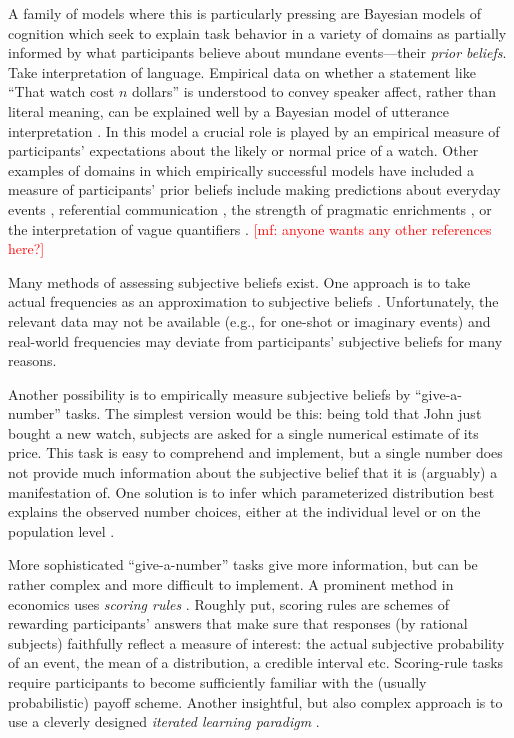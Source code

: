 \documentclass[10pt,letterpaper]{article}
\newcommand{\mf}[1]{\textcolor{Red}{[mf: #1]}}
\newcommand{\citep}[1]{\cite{#1}}
\begin{document}
A family of models where this is particularly pressing are Bayesian models of cognition which
seek to explain task behavior in a variety of domains as partially informed by what
participants believe about mundane events---their \emph{prior beliefs}. Take interpretation of
language. Empirical data on whether a statement like ``That watch cost $n$ dollars'' is
understood to convey speaker affect, rather than literal meaning, can be explained well by a
Bayesian model of utterance interpretation \citep{KaoWu2014:Nonliteral-Unde}. In this model a
crucial role is played by an empirical measure of participants' expectations about the likely
or normal price of a watch.  Other examples of domains in which empirically successful models
have included a measure of participants' prior beliefs include making predictions about
everyday events \citep{GriffithsTenenbaum2006:Optimal-Predict}, referential communication
\citep{FrankGoodman2012:Predicting-Prag}, the strength of pragmatic enrichments
\citep{DegenTessler2015:Wonky-worlds:-L}, or the interpretation of vague quantifiers
\citep{SchollerFranke2015:Semantic-values}. \mf{anyone wants any other references here?}

Many methods of assessing subjective beliefs exist. One approach is to take actual frequencies
as an approximation to subjective beliefs
\citep{GriffithsTenenbaum2006:Optimal-Predict}. Unfortunately, the relevant data may not be
available (e.g., for one-shot or imaginary events) and real-world frequencies may deviate from
participants' subjective beliefs for many reasons.

Another possibility is to empirically measure subjective beliefs by ``give-a-number''
tasks. The simplest version would be this: being told that John just bought a new watch,
subjects are asked for a single numerical estimate of its price. This task is easy to
comprehend and implement, but a single number does not provide much information about the
subjective belief that it is (arguably) a manifestation of. One solution is to infer which
parameterized distribution best explains the observed number choices, either at the individual
level \citep{Manski2004:Measuring-Expec} or on the population level
\citep{TauberSteyvers2013:Inferring-Subje}.

More sophisticated ``give-a-number'' tasks give more information, but can be rather complex and
more difficult to implement. A prominent method in economics uses \emph{scoring rules}
\citep{Savage1971:Elicitation-of-,AndersenFountain2014:Estimating-Subj,SchlagTremewan2014:A-penny-for-you}. Roughly
put, scoring rules are schemes of rewarding participants' answers that make sure that responses
(by rational subjects) faithfully reflect a measure of interest: the actual subjective
probability of an event, the mean of a distribution, a credible interval etc. Scoring-rule
tasks require participants to become sufficiently familiar with the (usually probabilistic)
payoff scheme. Another insightful, but also complex approach is to use a cleverly designed
\emph{iterated learning paradigm} \citep{LewandowskyGriffiths2009:The-Wisdom-of-I}.
\end{document}
